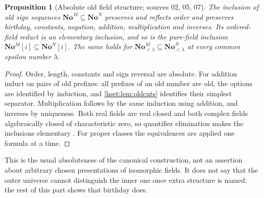 \documentclass[11pt,letterpaper]{article}
\newtheorem{proposition}[proposition]{Proposition}\aliascntresetthe{proposition}
\theoremstyle{definition}
\theoremstyle{remark}
\newcommand{\No}{\mathbf{No}}
\begin{document}
\begin{proposition}[Absolute old field structure; sources 02, 05, 07]
\label{hset:prop:absolute}
The inclusion of old sign sequences $\No^M\subseteq\No^N$ preserves and
reflects order and preserves birthday, constants, negation, addition,
multiplication and inverses. Its ordered-field reduct is an elementary
inclusion, and so is the pure-field inclusion $\No^M[i]\subseteq\No^N[i]$. The
same holds for $\No_{<\lambda}^M\subseteq\No_{<\lambda}^N$ at every common epsilon
number $\lambda$.
\end{proposition}
\begin{proof}
Order, length, constants and sign reversal are absolute. For addition induct on
pairs of old prefixes: all prefixes of an old number are old, the options are
identified by induction, and \cref{hset:lem:oldcuts} identifies their simplest
separator. Multiplication follows by the same induction using addition, and
inverses by uniqueness. Both real fields are real closed and both complex
fields algebraically closed of characteristic zero, so quantifier elimination
makes the inclusions elementary \cite{Marker,Deloro}. For proper classes the
equivalences are applied one formula at a time.
\end{proof}

This is the usual absoluteness of the canonical construction, not an assertion
about arbitrary chosen presentations of isomorphic fields. It does not say that
the outer universe cannot distinguish the inner one once extra structure is
named: the rest of this part shows that birthday does.
\end{document}
